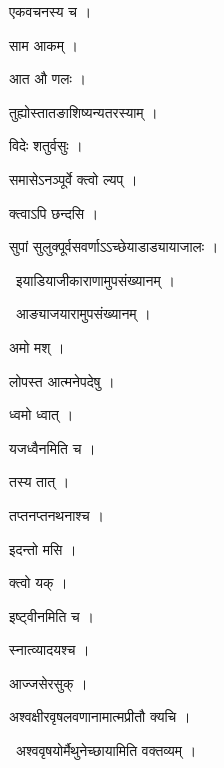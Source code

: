 \documentclass[10pt, openany, oneside]{book}
\begin{document}
\noindent एकवचनस्य च ।

\noindent साम आकम् ।

\noindent आत औ णलः ।

\noindent तुह्योस्तातङाशिष्यन्यतरस्याम् ।

\noindent विदेः शतुर्वसुः ।

\noindent समासेऽनञ्पूर्वे क्त्वो ल्यप् ।

\noindent क्त्वाऽपि छन्दसि ।

\noindent सुपां सुलुक्पूर्वसवर्णाऽऽच्छेयाडाड्यायाजालः ।

\par\noindent\hspace{1.5em}{\vps वा॰}~{\qt इयाडियाजीकाराणामुपसंख्यानम् ।}

\par\noindent\hspace{1.5em}{\vps वा॰}~{\qt आङ्याजयारामुपसंख्यानम् ।}

\noindent अमो मश् ।

\noindent लोपस्त आत्मनेपदेषु ।

\noindent ध्वमो ध्वात् ।

\noindent यजध्वैनमिति च ।

\noindent तस्य तात् ।

\noindent तप्तनप्तनथनाश्च ।

\noindent इदन्तो मसि ।

\noindent क्त्वो यक् ।

\noindent इष्ट्वीनमिति च ।

\noindent स्नात्व्यादयश्च ।

\noindent आज्जसेरसुक् ।

\noindent अश्वक्षीरवृषलवणानामात्मप्रीतौ क्यचि ।

\par\noindent\hspace{1.5em}{\vps वा॰}~{\qt अश्ववृषयोर्मैथुनेच्छायामिति वक्तव्यम् ।}
\end{document}
